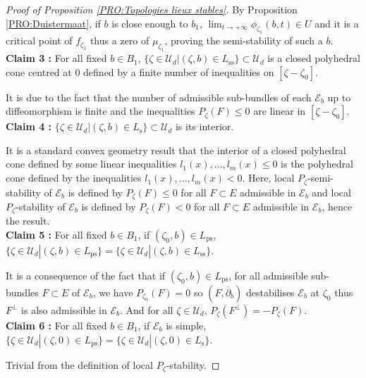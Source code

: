 \documentclass{article}
\theoremstyle{remark}
\theoremstyle{definition}
\newcommand{\E}{\mathcal{E}}
\newcommand{\mU}{\mathcal{U}}
\newcommand{\dbar}{\overline{\partial}}
\renewcommand{\leq}{\leqslant}
\begin{document}
\begin{proof}[Proof of Proposition \ref{PRO:Topologies lieux stables}]
By Proposition \ref{PRO:Duistermaat}, if $b$ is close enough to $b_1$, $\lim_{t \rightarrow +\infty} \phi_{\zeta_1}(b,t) \in U$ and it is a critical point of $f_{\zeta_1}$ thus a zero of $\mu_{\zeta_1}$, proving the semi-stability of such a $b$.\\

\noindent\textbf{Claim 3 :} For all fixed $b \in B_1$, $\{\zeta \in \mU_d|(\zeta,b) \in L_{\mathrm{ss}}\} \subset \mU_d$ is a closed polyhedral cone centred at $0$ defined by a finite number of inequalities on $[\zeta - \zeta_0]$.

It is due to the fact that the number of admissible sub-bundles of each $\E_b$ up to diffeomorphism is finite and the inequalities $P_\zeta(F) \leq 0$ are linear in $[\zeta - \zeta_0]$.\\

\noindent\textbf{Claim 4 :} $\{\zeta \in \mU_d|(\zeta,b) \in L_{\mathrm{s}}\} \subset \mU_d$ is its interior.

It is a standard convex geometry result that the interior of a closed polyhedral cone defined by some linear inequalities $l_1(x),\ldots,l_m(x) \leq 0$ is the polyhedral cone defined by the inequalities $l_1(x),\ldots,l_m(x) < 0$. Here, local $P_\zeta$-semi-stability of $\E_b$ is defined by $P_\zeta(F) \leq 0$ for all $F \subset E$ admissible in $\E_b$ and local $P_\zeta$-stability of $\E_b$ is defined by $P_\zeta(F) < 0$ for all $F \subset E$ admissible in $\E_b$, hence the result.\\

\noindent\textbf{Claim 5 :} For all fixed $b \in B_1$, if $(\zeta_0,b) \in L_{\mathrm{ps}}$, $\{\zeta \in \mU_d|(\zeta,b) \in L_{\mathrm{ps}}\} = \{\zeta \in \mU_d|(\zeta,b) \in L_{\mathrm{ss}}\}$.

It is a consequence of the fact that if $(\zeta_0,b) \in L_{\mathrm{ps}}$, for all admissible sub-bundles $F \subset E$ of $\E_b$, we have $P_{\zeta_0}(F) = 0$ so $(F,\dbar_b)$ destabilises $\E_b$ at $\zeta_0$ thus $F^\bot$ is also admissible in $\E_b$. And for all $\zeta \in \mU_d$, $P_\zeta(F^\bot) = -P_\zeta(F)$.\\

\noindent\textbf{Claim 6 :} For all fixed $b \in B_1$, if $\E_b$ is simple, $\{\zeta \in \mU_d|(\zeta,0) \in L_{\mathrm{ps}}\} = \{\zeta \in \mU_d|(\zeta,0) \in L_{\mathrm{s}}\}$.

Trivial from the definition of local $P_\zeta$-stability.
\end{proof}
\end{document}
